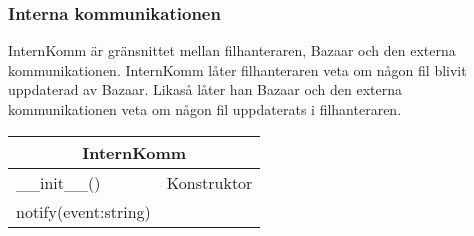 \subsubsection{Interna kommunikationen}
InternKomm är gränsnittet mellan filhanteraren, Bazaar och den externa kommunikationen. InternKomm låter filhanteraren veta om någon fil blivit uppdaterad av Bazaar. Likaså låter han Bazaar och den externa kommunikationen veta om någon fil uppdaterats i filhanteraren.

\begin{tabular}{|l|l|}
\hline
\multicolumn{2}{|c|}{\textbf{InternKomm}} \\
\hline
\hline
\_\_init\_\_() &Konstruktor\\
notify(event:string)\\
\hline
\end{tabular}

